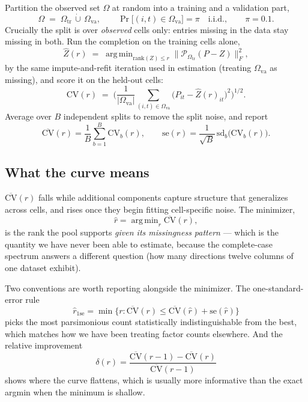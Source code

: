 \documentclass[11pt]{article}
\DeclareMathOperator*{\argmin}{arg\,min}
\begin{document}
Partition the observed set $\Omega$ at random into a training and a validation
part,
\begin{equation}
  \Omega \;=\; \Omega_{\mathrm{tr}} \,\dot\cup\, \Omega_{\mathrm{va}},
  \qquad
  \Pr\bigl[(i,t) \in \Omega_{\mathrm{va}}\bigr] = \pi \quad \text{i.i.d.},
  \qquad \pi = 0.1 .
\end{equation}
Crucially the split is over \emph{observed} cells only: entries missing in the
data stay missing in both. Run the completion on the training cells alone,
\begin{equation}
  \hat Z(r) \;=\; \argmin_{\mathrm{rank}(Z)\le r}
  \bigl\| \mathcal{P}_{\Omega_{\mathrm{tr}}}(P - Z) \bigr\|_F^2 ,
\end{equation}
by the same impute-and-refit iteration used in estimation (treating
$\Omega_{\mathrm{va}}$ as missing), and score it on the held-out cells:
\begin{equation}
  \mathrm{CV}(r) \;=\;
  \Biggl( \frac{1}{|\Omega_{\mathrm{va}}|}
  \sum_{(i,t)\in\Omega_{\mathrm{va}}} \bigl( P_{it} - \hat Z(r)_{it} \bigr)^2
  \Biggr)^{1/2} .
  \label{eq:cv}
\end{equation}
Average over $B$ independent splits to remove the split noise, and report
\begin{equation}
  \overline{\mathrm{CV}}(r) = \frac{1}{B}\sum_{b=1}^{B}\mathrm{CV}_b(r),
  \qquad
  \mathrm{se}(r) = \frac{1}{\sqrt{B}}\,\mathrm{sd}_b\bigl(\mathrm{CV}_b(r)\bigr).
\end{equation}

\subsection{What the curve means}

$\overline{\mathrm{CV}}(r)$ falls while additional components capture structure
that generalizes across cells, and rises once they begin fitting cell-specific
noise. The minimizer,
\begin{equation}
  \hat r = \argmin_r \overline{\mathrm{CV}}(r),
\end{equation}
is the rank the pool supports \emph{given its missingness pattern} --- which is
the quantity we have never been able to estimate, because the complete-case
spectrum answers a different question (how many directions twelve columns of one
dataset exhibit).

Two conventions are worth reporting alongside the minimizer. The
one-standard-error rule
\begin{equation}
  \hat r_{1\mathrm{se}} = \min\bigl\{ r : \overline{\mathrm{CV}}(r) \le
  \overline{\mathrm{CV}}(\hat r) + \mathrm{se}(\hat r) \bigr\}
\end{equation}
picks the most parsimonious count statistically indistinguishable from the best,
which matches how we have been treating factor counts elsewhere. And the
relative improvement
\begin{equation}
  \delta(r) = \frac{\overline{\mathrm{CV}}(r-1) - \overline{\mathrm{CV}}(r)}
                   {\overline{\mathrm{CV}}(r-1)}
\end{equation}
shows where the curve flattens, which is usually more informative than the exact
argmin when the minimum is shallow.
\end{document}
